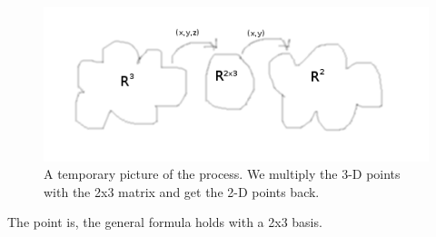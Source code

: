 \documentclass[a4paper]{article}
\begin{document}
\begin{Example}
\begin{figure}
\includegraphics{mediator.png}
\caption{A temporary picture of the process. We multiply the 3-D points with the 2x3 matrix and get the 2-D points back.}
\end{figure}

The point is, the general formula holds with a 2x3 basis.\\

\\



\end{Example}
\end{document}

